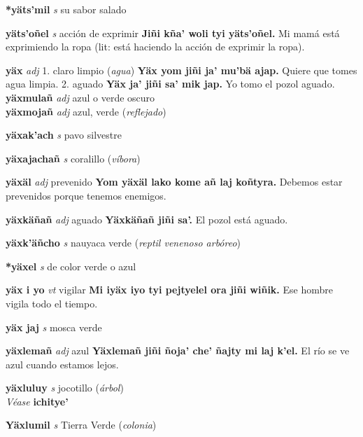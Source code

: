 \documentclass[10pt]{scrbook}
\newcommand{\entry}[1]{\textbf{#1}}
\newcommand{\onedefinition}[1]{#1.}
\newcommand{\partofspeech}[1]{\textit{#1}}
\newcommand{\spanishtranslation}[1]{#1}
\newcommand{\clarification}[1]{(\textit{#1})}
\newcommand{\cholexample}[1]{\textbf{#1}}
\newcommand{\exampletranslation}[1]{#1}
\newcommand{\alsosee}[1]{\\\textit{Véase} \textbf{#1}}
\newcommand{\secondaryentry}[1]{\\\textbf{#1}}
\newcommand{\secondpartofspeech}[1]{\textit{#1}}
\newcommand{\secondtranslation}[1]{#1}
\begin{document}
\begin{multicols}{2}
\entry{*yäts'mil}
\partofspeech{s}
\spanishtranslation{su sabor salado}

\entry{yäts'oñel}
\partofspeech{s}
\spanishtranslation{acción de exprimir}
\cholexample{Jiñi kña' woli tyi yäts'oñel.}
\exampletranslation{Mi mamá está exprimiendo la ropa (lit: está haciendo la acción de exprimir la ropa).}

\entry{yäx}
\partofspeech{adj}
\onedefinition{1}
\spanishtranslation{claro}
\spanishtranslation{limpio}
\clarification{agua}
\cholexample{Yäx yom jiñi ja' mu'bä ajap.}
\exampletranslation{Quiere que tomes agua limpia.}
\onedefinition{2}
\spanishtranslation{aguado}
\cholexample{Yäx ja' jiñi sa' mik jap.}
\exampletranslation{Yo tomo el pozol aguado.}
\secondaryentry{yäxmulañ}
\secondpartofspeech{adj}
\secondtranslation{azul o verde oscuro}
\secondaryentry{yäxmojañ}
\secondpartofspeech{adj}
\secondtranslation{azul, verde}
\clarification{reflejado}

\entry{yäxak'ach}
\partofspeech{s}
\spanishtranslation{pavo silvestre}

\entry{yäxajachañ}
\partofspeech{s}
\spanishtranslation{coralillo}
\clarification{víbora}

\entry{yäxäl}
\partofspeech{adj}
\spanishtranslation{prevenido}
\cholexample{Yom yäxäl lako kome añ laj koñtyra.}
\exampletranslation{Debemos estar prevenidos porque tenemos enemigos.}

\entry{yäxkäñañ}
\partofspeech{adj}
\spanishtranslation{aguado}
\cholexample{Yäxkäñañ jiñi sa'.}
\exampletranslation{El pozol está aguado.}

\entry{yäxk'äñcho}
\partofspeech{s}
\spanishtranslation{nauyaca verde}
\clarification{reptil venenoso arbóreo}

\entry{*yäxel}
\partofspeech{s}
\spanishtranslation{de color verde o azul}

\entry{yäx i yo}
\partofspeech{vt}
\spanishtranslation{vigilar}
\cholexample{Mi iyäx iyo tyi pejtyelel ora jiñi wiñik.}
\exampletranslation{Ese hombre vigila todo el tiempo.}

\entry{yäx jaj}
\partofspeech{s}
\spanishtranslation{mosca verde}

\entry{yäxlemañ}
\partofspeech{adj}
\spanishtranslation{azul}
\cholexample{Yäxlemañ jiñi ñoja' che' ñajty mi laj k'el.}
\exampletranslation{El río se ve azul cuando estamos lejos.}

\entry{yäxluluy}
\partofspeech{s}
\spanishtranslation{jocotillo}
\clarification{árbol}
\alsosee{ichitye'}

\entry{Yäxlumil}
\partofspeech{s}
\spanishtranslation{Tierra Verde}
\clarification{colonia}


\end{multicols}
\end{document}
